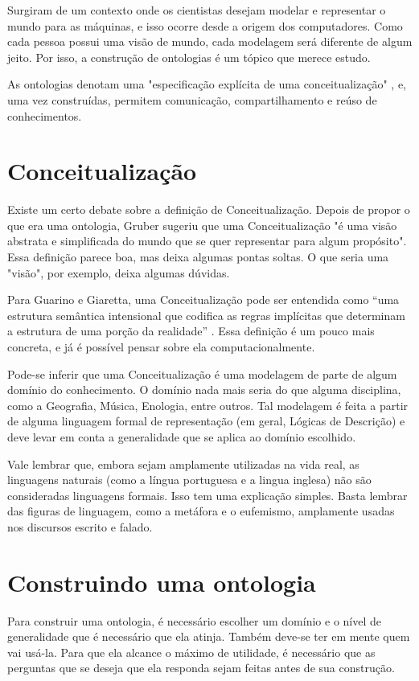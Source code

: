 Surgiram de um contexto onde os cientistas desejam modelar e representar o mundo para as máquinas, e isso ocorre desde a origem dos computadores. Como cada pessoa possui uma visão de mundo, cada modelagem será diferente de algum jeito. Por isso, a construção de ontologias é um tópico que merece estudo.

As ontologias denotam uma "especificação explícita de uma conceitualização"  \citep{ontoGruber}, e, uma vez construídas, permitem comunicação, compartilhamento e reúso de conhecimentos.

\section{Conceitualização}
	
Existe um certo debate sobre a definição de Conceitualização. Depois de propor o que era uma ontologia, Gruber sugeriu que uma Conceitualização "é uma visão abstrata e simplificada do mundo que se quer representar para algum propósito". Essa definição parece boa, mas deixa algumas pontas soltas. O que seria uma "visão", por exemplo, deixa algumas dúvidas.

Para Guarino e Giaretta, uma Conceitualização pode ser entendida como “uma estrutura semântica intensional que codifica as regras implícitas que determinam a estrutura de uma porção da realidade” \citep{ontoGiaretta}. Essa definição é um pouco mais concreta, e já é possível pensar sobre ela computacionalmente.

Pode-se inferir que uma Conceitualização é uma modelagem de parte de algum domínio do conhecimento. O domínio nada mais seria do que alguma disciplina, como a Geografia, Música, Enologia, entre outros. Tal modelagem é feita a partir de alguma linguagem formal de representação (em geral, Lógicas de Descrição) e deve levar em conta a generalidade que se aplica ao domínio escolhido.

Vale lembrar que, embora sejam amplamente utilizadas na vida real, as linguagens naturais (como a língua portuguesa e a lingua inglesa) não são consideradas linguagens formais. Isso tem uma explicação simples. Basta lembrar das figuras de linguagem, como a metáfora e o eufemismo, amplamente usadas nos discursos escrito e falado. 

\section{Construindo uma ontologia}

Para construir uma ontologia, é necessário escolher um domínio e o nível de generalidade que é necessário que ela atinja. Também deve-se ter em mente quem vai usá-la. Para que ela alcance o máximo de utilidade, é necessário que as perguntas que se deseja que ela responda sejam feitas antes de sua construção.

